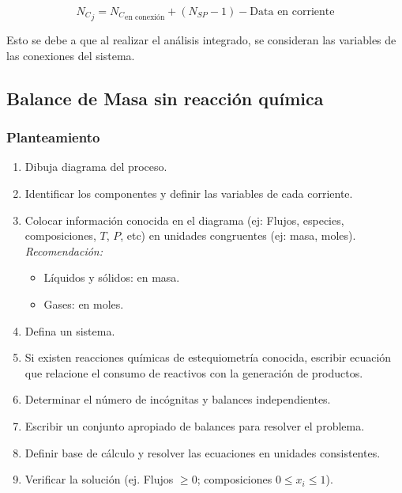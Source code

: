         \[{N_{C}}_{j} = {N_{C}}_{\text{en conexión}} + (N_{SP} - 1) - \text{Data en corriente}\]
        
        \begin{quote}
            \textit{}
        \end{quote}
        
        Esto se debe a que al realizar el análisis integrado, se consideran las variables de las conexiones del sistema.
    
    \subsection{Balance de Masa sin reacción química}
    
        \subsubsection{Planteamiento}
        
        \begin{enumerate}
            \item Dibuja diagrama del proceso.
            \item Identificar los componentes y definir las variables de cada corriente.
            \item Colocar información conocida en el diagrama (ej: Flujos, especies, composiciones, \(T\), \(P\), etc) en unidades congruentes (ej: masa, moles).
            \textit{Recomendación:}
            \begin{itemize}
                \item Líquidos y sólidos: en masa.
                \item Gases: en moles.
            \end{itemize}
            \item Defina un sistema.
            \item Si existen reacciones químicas de estequiometría conocida, escribir ecuación que relacione el consumo de reactivos con la generación de productos.
            \item Determinar el número de incógnitas y balances independientes.
            \item Escribir un conjunto apropiado de balances para resolver el problema.
            \item Definir base de cálculo y resolver las ecuaciones en unidades consistentes.
            \item Verificar la solución (ej. Flujos \(\geq 0\); composiciones \(0 \leq x_{i} \leq 1\)).
        \end{enumerate}
        
